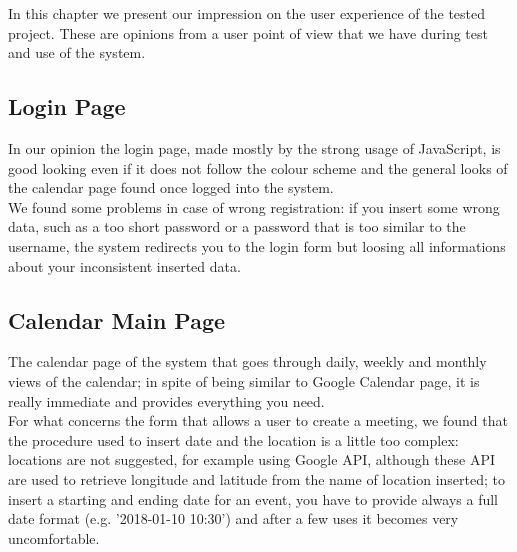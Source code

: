 In this chapter we present our impression on the user experience of the tested project. These are opinions from a user point of view that we have during test and use of the system.

\subsection{Login Page}
In our opinion the login page, made mostly by the strong usage of JavaScript, is good looking even if it does not follow the colour scheme and the general looks of the calendar page found once logged into the system. \\
We found some problems in case of wrong registration: if you insert some wrong data, such as a too short password or a password that is too similar to the username, the system redirects you to the login form but loosing all informations about your inconsistent inserted data.

\subsection{Calendar Main Page}
The calendar page of the system that goes through daily, weekly and monthly views of the calendar; in spite of being similar to Google Calendar page, it is really immediate and provides everything you need. \\
For what concerns the form that allows a user to create a meeting, we found that the procedure used to insert date and the location is a little too complex: locations are not suggested, for example using Google API, although these API are used to retrieve longitude and latitude from the name of location inserted; to insert a starting and ending date for an event, you have to provide always a full date format (e.g. '2018-01-10 10:30') and after a few uses it becomes very uncomfortable.

